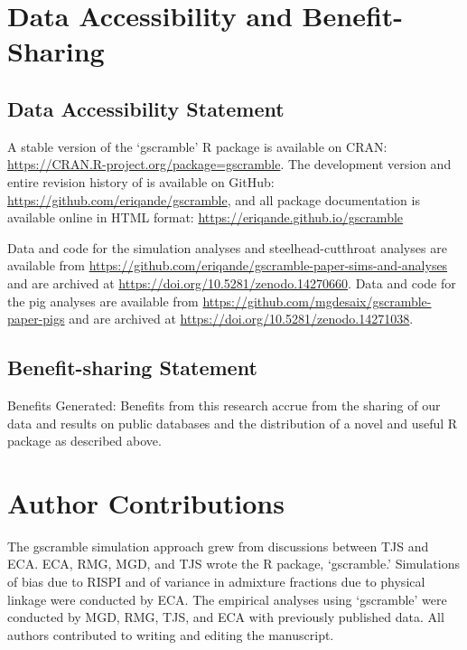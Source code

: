 \section*{Data Accessibility and Benefit-Sharing}

\subsection*{Data Accessibility Statement}

A stable version of the `gscramble' R package is available on CRAN: \url{https://CRAN.R-project.org/package=gscramble}. The development version and entire revision history of
\gscramble{} is available on GitHub: \url{https://github.com/eriqande/gscramble}, and all package documentation is available online in HTML format: \url{https://eriqande.github.io/gscramble}

Data and code for the simulation analyses and steelhead-cutthroat analyses are available from \url{https://github.com/eriqande/gscramble-paper-sims-and-analyses} and are archived at \url{https://doi.org/10.5281/zenodo.14270660}.  Data and code for the pig analyses are available from \url{https://github.com/mgdesaix/gscramble-paper-pigs} and are archived
at \url{https://doi.org/10.5281/zenodo.14271038}.

\subsection*{Benefit-sharing Statement}

Benefits Generated: Benefits from this research accrue from the sharing of our data and results on public databases and the distribution of a novel and useful R package as described above.

\section*{Author Contributions}

The gscramble simulation approach grew from discussions between TJS and ECA\@.
ECA, RMG, MGD, and TJS wrote the R package, `gscramble.'   Simulations of bias due to RISPI and
of variance in admixture fractions due to physical linkage were conducted by ECA.
The empirical analyses using `gscramble' were conducted by MGD, RMG, TJS, and ECA with previously published data.
All authors contributed to writing and editing the manuscript.

